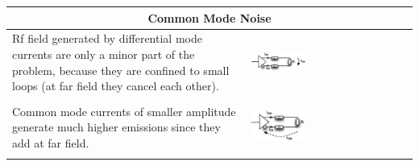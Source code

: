 		
		\begin{table}[h!]
		\centering
		\begin{tabular}{|m{}|m{}|}
				\multicolumn{2}{c}{\textbf{Common Mode Noise}}
			\\
			\hline
				Rf field generated by differential mode currents are only a minor part of the problem, because they are confined to small loops (at far field they cancel each other). 
			& 
				 \begin{center}\includegraphics[width=0.35\textwidth]{images/DiffMode.png}\end{center}  
			\\
			\hline
				Common mode currents of smaller amplitude generate much higher emissions since they add at far field. 
			& 
				 \begin{center}\includegraphics[width=0.35\textwidth]{images/CommonMode.png}\end{center}  
			\\
			\hline
			\end{tabular}
		\end{table}

